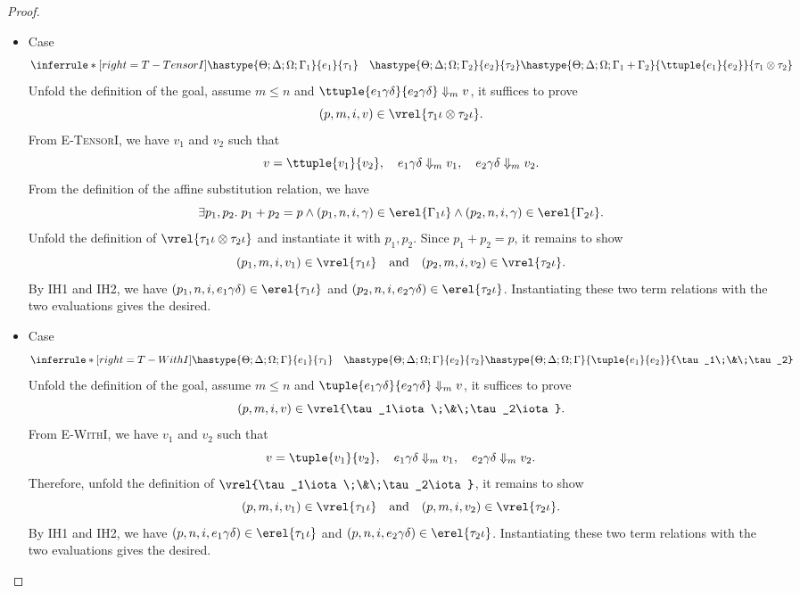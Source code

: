 \begin{proof}
\begin{itemize}
\item Case
\[
  \inferrule*[right=T-TensorI]
        {\hastype{\Theta;\Delta;\Omega;\Gamma_1}{e_1}{\tau_1}
         \quad \hastype{\Theta;\Delta;\Omega;\Gamma_2}{e_2}{\tau_2}}
        {\hastype{\Theta;\Delta;\Omega;\Gamma_1+\Gamma_2}{\ttuple{e_1}{e_2}}{\tau_1\otimes\tau_2}}
\]
Unfold the definition of the goal, assume $m\leq n$ and
$\ttuple{e_1\gamma\delta}{e_2\gamma\delta}\Downarrow_m v$, it suffices to prove
\[(p, m, i, v)\in\vrel{\tau_1\iota\otimes\tau_2\iota}.\]
From \textsc{E-TensorI}, we have $v_1$ and $v_2$ such that
\[
  v=\ttuple{v_1}{v_2},\quad
  e_1\gamma\delta\Downarrow_m v_1,
  \quad e_2\gamma\delta\Downarrow_m v_2.
\]
From the definition of the affine substitution relation, we have
\[
  \exists p_1, p_2.\;p_1 + p_2= p \land
  (p_1,n,i,\gamma) \in \erel{\Gamma_1\iota} \land
  (p_2,n, i, \gamma) \in \erel{\Gamma_2\iota}.
\]
Unfold the definition of $\vrel{\tau_1\iota\otimes\tau_2\iota}$ and instantiate it with $p_1, p_2$.
Since $p_1+p_2 = p$, it remains to show
\[
  (p_1, m, i, v_1)\in\vrel{\tau_1\iota}
  \quad\text{and}\quad
  (p_2, m, i, v_2)\in\vrel{\tau_2\iota}.
\]
By IH1 and IH2, we have $(p_1, n, i, e_1\gamma\delta)\in\erel{\tau_1\iota}$ and
$(p_2, n, i, e_2\gamma\delta)\in\erel{\tau_2\iota}$. Instantiating these two term
relations with the two evaluations gives the desired.

\item Case
\[
  \inferrule*[right=T-WithI]
        {\hastype{\Theta;\Delta;\Omega;\Gamma}{e_1}{\tau_1}
         \quad \hastype{\Theta;\Delta;\Omega;\Gamma}{e_2}{\tau_2}}
        {\hastype{\Theta;\Delta;\Omega;\Gamma}{\tuple{e_1}{e_2}}{\tau_1\;\&\;\tau_2}}
\]
Unfold the definition of the goal, assume $m\leq n$ and
$\tuple{e_1\gamma\delta}{e_2\gamma\delta}\Downarrow_m v$, it suffices to prove
\[(p, m, i, v)\in\vrel{\tau_1\iota\;\&\;\tau_2\iota}.\]
From \textsc{E-WithI}, we have $v_1$ and $v_2$ such that
\[
  v=\tuple{v_1}{v_2},\quad
  e_1\gamma\delta\Downarrow_m v_1,
  \quad e_2\gamma\delta\Downarrow_m v_2.
\]
Therefore, unfold the definition of $\vrel{\tau_1\iota\;\&\;\tau_2\iota}$, it remains to show
\[
  (p, m, i, v_1)\in\vrel{\tau_1\iota}
  \quad\text{and}\quad
  (p, m, i, v_2)\in\vrel{\tau_2\iota}.
\]
By IH1 and IH2, we have $(p, n, i, e_1\gamma\delta)\in\erel{\tau_1\iota}$ and
$(p, n, i, e_2\gamma\delta)\in\erel{\tau_2\iota}$. Instantiating these two term
relations with the two evaluations gives the desired.


\end{itemize}
\end{proof}
